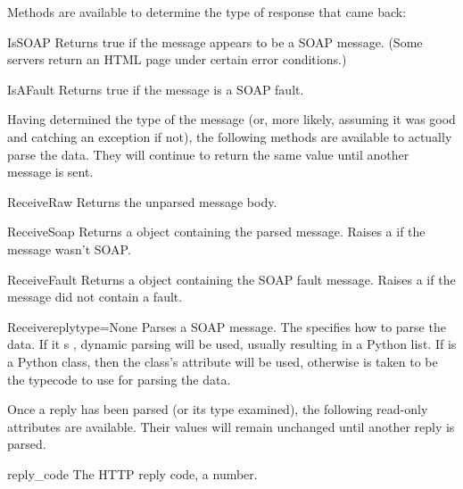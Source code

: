 Methods are available to determine the type of response that came back:

\begin{methoddesc}{IsSOAP}{}
Returns true if the message appears to be a SOAP message.
(Some servers return an HTML page under certain error conditions.)
\end{methoddesc}

\begin{methoddesc}{IsAFault}{}
Returns true if the message is a SOAP fault.
\end{methoddesc}

Having determined the type of the message (or, more likely, assuming
it was good and catching an exception if not), the following methods
are available to actually parse the data.
They will continue to return the same value until
another message is sent.

\begin{methoddesc}{ReceiveRaw}{}
Returns the unparsed message body.
\end{methoddesc}

\begin{methoddesc}{ReceiveSoap}{}
Returns a  object containing the parsed message.
Raises a  if the message wasn't SOAP.
\end{methoddesc}

\begin{methoddesc}{ReceiveFault}{}
Returns a  object containing the SOAP fault message.
Raises a  if the message did not contain a fault.
\end{methoddesc}

\begin{methoddesc}{Receive}{replytype=None}
Parses a SOAP message.
The  specifies how to parse the data.
If it s , dynamic parsing will be used, usually resulting
in a Python list.
If  is a Python class, then the class's 
attribute will be used, otherwise  is taken to be
the typecode to use for parsing the data.
\end{methoddesc}

Once a reply has been parsed (or its type examined), the following
read-only attributes are available.
Their values will remain unchanged until another reply is parsed.

\begin{memberdesc}{reply_code}
The HTTP reply code, a number.
\end{memberdesc}

